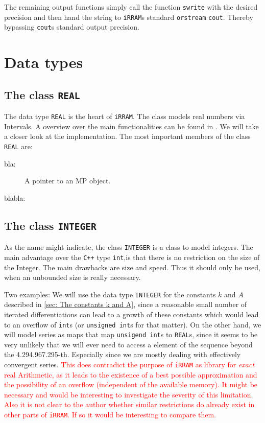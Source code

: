 \documentclass{article}
\newcommand{\irram}{\texttt{iRRAM}\xspace}
\newcommand{\irrams}{\texttt{iRRAM}s\xspace}
\newcommand{\cc}{\texttt{C++}\xspace}
\newcommand{\ir}[1]{\texttt{#1}}
\newcommand{\code}[1]{\texttt{#1}}
\newcommand{\temp}[1]{\textcolor{red}{#1}}
\begin{document}
The remaining output functions simply call the function \ir{swrite} with the desired precision and then hand the string to \irrams standard \ir{orstream} \ir{cout}. Thereby bypassing \ir{cout}s standard output precision.


\section{Data types}

\subsection{The class \ir{REAL}}

The data type \ir{REAL} is the heart of \irram. The class models real numbers via Intervals. A overview over the main functionalities can be found in \cite{Muller2013}. We will take a closer look at the implementation. The most important members of the class \ir{REAL} are:
\begin{description}
\item[bla:] A pointer to an MP object.
\item[blabla:]
\end{description}

\subsection{The class \ir{INTEGER}}

As the name might indicate, the class \ir{INTEGER} is a class to model integers. The main advantage over the \cc type \code{int},is that there is no restriction on the size of the Integer. The main drawbacks are size and speed. Thus it should only be used, when an unbounded size is really necessary.

Two examples: We will use the data type \ir{INTEGER} for the constants $k$ and $A$ described in \cref{sec: The constants k and A}, since a reasonable small number of iterated differentiations can lead to a growth of these constants which would lead to an overflow of \code{int}s (or \code{unsigned int}s for that matter). On the other hand, we will model series as maps that map \code{unsigend int}s to \code{REAL}s, since it seems to be very unlikely that we will ever need to access a element of the sequence beyond the 4.294.967.295-th. Especially since we are mostly dealing with effectively convergent series. \temp{This does contradict the purpose of \irram as library for \emph{exact} real Arithmetic, as it leads to the existence of a best possible approximation and the possibility of an overflow (independent of the available memory). It might be necessary and would be interesting to investigate the severity of this limitation. Also it is not clear to the author whether similar restrictions do already exist in other parts of \irram. If so it would be interesting to compare them.}
\end{document}
